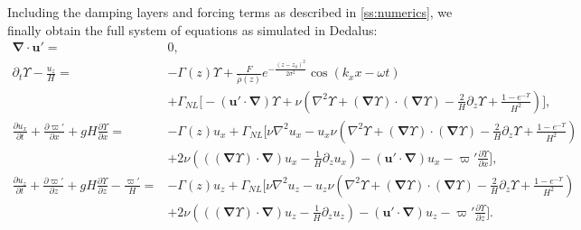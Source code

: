\documentclass[
        fleqn,
        usenatbib,
    ]{mnras}
\newcommand*{\pd}[2]{\frac{\partial#1}{\partial#2}}
\newcommand*{\p}[1]{\left(#1\right)}
\newcommand*{\bm}[1]{\mathbf{#1}}
\begin{document}
Including the damping layers and forcing terms as described in
\autoref{ss:numerics}, we finally obtain the full system of equations as
simulated in Dedalus:
\begin{subequations}\label{se:dedalus_eqs}
    \begin{align}
        \bm{\nabla} \cdot \bm{u}' ={}& 0,\\
        \partial_t \Upsilon - \frac{u_z}{H}
            ={}& -\Gamma(z) \Upsilon
                + \frac{F}{\overline{\rho}(z)}e^{-\frac{(z - z_0)^2}{2\sigma^2}}
                    \cos \p{k_xx - \omega t}\nonumber\\
            & + \Gamma_{NL} \bigg[-\p{\bm{u}' \cdot \bm{\nabla}}\Upsilon
                + \nu\p{\nabla^2 \Upsilon + \p{
                    \bm{\nabla} \Upsilon} \cdot \p{\bm{\nabla}\Upsilon}
                    - \frac{2}{H}\partial_z \Upsilon
                    + \frac{1 - e^{-\Upsilon}}{H^2}}\bigg],\\
        \pd{u_x}{t} + \pd{\varpi'}{x} + gH\pd{\Upsilon}{x} ={}&
            -\Gamma(z) u_x
            + \Gamma_{NL}\bigg[\nu \nabla^2 u_x
            - u_x \nu\p{\nabla^2 \Upsilon + \p{\bm{\nabla} \Upsilon} \cdot
                \p{\bm{\nabla}\Upsilon} - \frac{2}{H}\partial_z \Upsilon
                + \frac{1 - e^{-\Upsilon}}{H^2}}\nonumber\\
            &+ 2\nu \p{\p{\p{\bm{\nabla}\Upsilon} \cdot \bm{\nabla}}u_x
                - \frac{1}{H}\partial_z u_x}
                - \p{\bm{u}' \cdot \bm{\nabla}}u_x
                - \varpi' \pd{\Upsilon}{x}\bigg],\\
        \pd{u_z}{t} + \pd{\varpi'}{z} + gH\pd{\Upsilon}{z} - \frac{\varpi'}{H}
            ={}& -\Gamma(z) u_z
            +\Gamma_{NL}\bigg[\nu \nabla^2 u_z
            - u_z \nu\p{\nabla^2 \Upsilon + \p{\bm{\nabla} \Upsilon} \cdot
                \p{\bm{\nabla}\Upsilon} - \frac{2}{H}\partial_z \Upsilon
                + \frac{1 - e^{-\Upsilon}}{H^2}}\nonumber\\
            &+ 2\nu \p{\p{\p{\bm{\nabla}\Upsilon} \cdot \bm{\nabla}}u_z -
                \frac{1}{H}\partial_z u_{z}}
            - \p{\bm{u}' \cdot \bm{\nabla}}u_z
            - \varpi' \pd{\Upsilon}{z}\bigg].
    \end{align}
\end{subequations}
\label{lastpage} %
\end{document}

